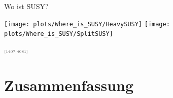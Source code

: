 \documentclass[hyperref={pdfpagelabels=false},ngerman]{beamer}
\newcommand{\MS}{\ensuremath{M_S}}
\newcommand{\mycite}[1]{\ensuremath{\text{\textcolor{darkgray}{\tiny [#1]}}}}
\renewcommand{\emph}[1]{\textbf{\textcolor{darkblue}{#1}}}
\begin{document}

\begin{frame}{Wo ist SUSY?}
  \begin{center}
    \texttt{[image: plots/Where\_is\_SUSY/HeavySUSY]}\hfill
    \texttt{[image: plots/Where\_is\_SUSY/SplitSUSY]}
  \end{center}
  \raggedleft\mycite{1407.4081}
\end{frame}


\section{Zusammenfassung}
\end{document}
